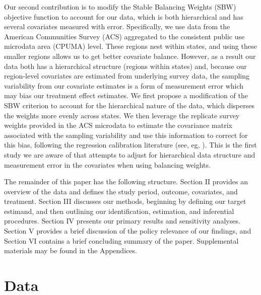 \documentclass[12pt]{article}
\begin{document}
Our second contribution is to modify the Stable Balancing Weights (SBW) objective function to account for our data, which is both hierarchical and has several covariates measured with error. Specifically, we use data from the American Communities Survey (ACS) aggregated to the consistent public use microdata area (CPUMA) level. These regions nest within states, and using these smaller regions allows us to get better covariate balance. However, as a result our data both has a hierarchical structure (regions within states) and, because our region-level covariates are estimated from underlying survey data, the sampling variability from our covariate estimates is a form of measurement error which may bias our treatment effect estimates. We first propose a modification of the SBW criterion to account for the hierarchical nature of the data, which disperses the weights more evenly across states. We then leverage the replicate survey weights provided in the ACS microdata to estimate the covariance matrix associated with the sampling variability and use this information to correct for this bias, following the regression calibration literature (see, eg, \cite{gleser1992importance}). This is the first study we are aware of that attempts to adjust for hierarchical data structure and measurement error in the covariates when using balancing weights. 

The remainder of this paper has the following structure. Section II provides an overview of the data and defines the study period, outcome, covariates, and treatment. Section III discusses our methods, beginning by defining our target estimand, and then outlining our identification, estimation, and inferential procedures. Section IV presents our primary results and sensitivity analyses. Section V provides a brief discussion of the policy relevance of our findings, and Section VI contains a brief concluding summary of the paper. Supplemental materials may be found in the Appendices.

\section{Data}
\end{document}
